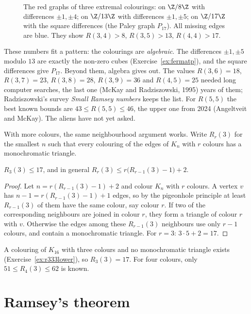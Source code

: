 \begin{figure}[ht]
\centering
{}
\caption{The red graphs of three extremal colourings: on $\Z/8\Z$ with differences $\pm1,\pm4$; on $\Z/13\Z$ with differences $\pm1,\pm5$; on $\Z/17\Z$ with the square
differences (the Paley graph $P_{17}$). All missing edges are blue. They show $R(3,4)>8$, $R(3,5)>13$, $R(4,4)>17$.}
\label{fig:circulants}
\end{figure}

\begin{remark}
These numbers fit a pattern: the colourings are \emph{algebraic}. The differences $\pm1,\pm5$ modulo $13$ are exactly the non-zero cubes (Exercise~\ref{ex:fermatp}), and the
square differences give $P_{17}$. Beyond them, algebra gives out. The values $R(3,6)=18$, $R(3,7)=23$, $R(3,8)=28$, $R(3,9)=36$ and $R(4,5)=25$ needed long computer
searches, the last one (McKay and Radziszowski, 1995) years of them; Radziszowski's survey \emph{Small Ramsey numbers} keeps the list. For $R(5,5)$ the best
known bounds are $43\le R(5,5)\le46$, the upper one from 2024 (Angeltveit and McKay). The aliens have not yet asked.
\end{remark}

With more colours, the same neighbourhood argument works. Write $R_r(3)$ for the smallest $n$ such that every colouring of the edges of $K_n$ with $r$ colours has a monochromatic
triangle.

\begin{proposition}\label{prop:r333}
$R_3(3)\le17$, and in general $R_r(3)\le r\bigl(R_{r-1}(3)-1\bigr)+2$.
\end{proposition}
\begin{proof}
Let $n=r(R_{r-1}(3)-1)+2$ and colour $K_n$ with $r$ colours. A vertex $v$ has $n-1=r(R_{r-1}(3)-1)+1$ edges, so by the pigeonhole principle at least $R_{r-1}(3)$ of them
have the same colour, say colour $r$. If two of the corresponding neighbours are joined in colour $r$, they form a triangle of colour $r$ with $v$. Otherwise the
edges among these $R_{r-1}(3)$ neighbours use only $r-1$ colours, and contain a monochromatic triangle. For $r=3$: $3\cdot5+2=17$.
\end{proof}

A colouring of $K_{16}$ with three colours and no monochromatic triangle exists (Exercise~\ref{ex:r333lower}), so $R_3(3)=17$. For four colours, only
$51\le R_4(3)\le62$ is known.

\section{Ramsey's theorem}

